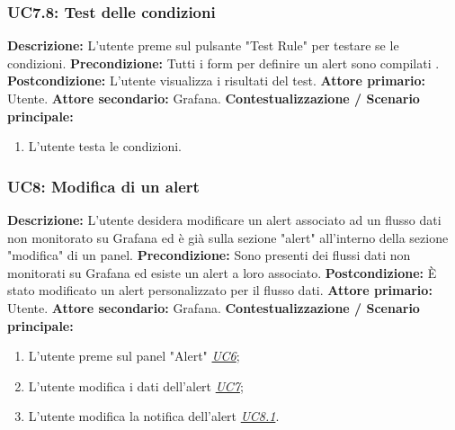                  \subsubsection{UC7.8: Test delle condizioni }
                    \textbf{Descrizione:} L’utente preme sul pulsante "Test Rule" per testare se le condizioni.
                    \newline
                    \textbf{Precondizione:} Tutti i form per definire un alert sono compilati .
                    \newline
                    \textbf{Postcondizione:} L'utente visualizza i risultati del test.
                    \newline
                    \textbf{Attore primario:} Utente.
                    \newline
                    \textbf{Attore secondario:} Grafana.
                    \newline
                    \textbf{Contestualizzazione / Scenario principale:} \begin{enumerate}
                            \item L'utente testa le condizioni.
                        \end{enumerate}
                        
                        
                		
            
                      		
               \subsubsection{UC8: Modifica di un alert}
                    \textbf{Descrizione:} L’utente desidera modificare un alert associato ad un flusso dati non monitorato su Grafana ed è già sulla sezione "alert" all'interno della sezione "modifica" di un panel.
                    \newline
                    \textbf{Precondizione:} Sono presenti dei flussi dati non monitorati su Grafana ed esiste un alert a loro associato.
                    \newline
                    \textbf{Postcondizione:} È stato modificato un alert personalizzato per il flusso dati.
                    \newline
                    \textbf{Attore primario:} Utente.
                    \newline
                    \textbf{Attore secondario:} Grafana.
                    \newline
                    \textbf{Contestualizzazione / Scenario principale:} \begin{enumerate}
                            \item L'utente preme sul panel "Alert" \underline{\textit{UC6}};
                            \item L'utente modifica i dati dell'alert \underline{\textit{UC7}};
                            \item L'utente modifica la notifica dell'alert \underline{\textit{UC8.1}}.
                        \end{enumerate}
                    

